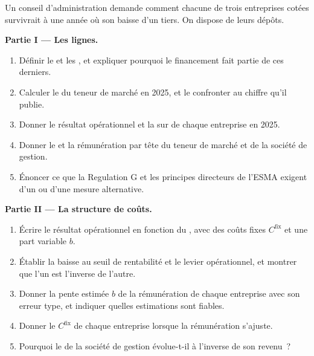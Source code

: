 \begin{problem}\label{pb:fm:the-economics-of-a-trading-firm:1}
Un conseil d'administration demande comment chacune de trois entreprises cotées survivrait à une année où son  baisse d'un tiers. On dispose de leurs dépôts.

\medskip\noindent\textbf{Partie I --- Les lignes.}
\begin{enumerate}
\item Définir le  et les , et expliquer pourquoi le financement fait partie de ces derniers.
\item Calculer le  du teneur de marché en 2025, et le confronter au chiffre qu'il publie.
\item Donner le résultat opérationnel et la  sur  de chaque entreprise en 2025.
\item Donner le  et la rémunération par tête du teneur de marché et de la société de gestion.
\item Énoncer ce que la Regulation G et les principes directeurs de l'ESMA exigent d'un  ou d'une mesure alternative.
\end{enumerate}

\medskip\noindent\textbf{Partie II --- La structure de coûts.}
\begin{enumerate}[resume]
\item Écrire le résultat opérationnel en fonction du , avec des coûts fixes $C^{\mathrm{fix}}$ et une part variable $b$.
\item Établir la baisse au seuil de rentabilité et le levier opérationnel, et montrer que l'un est l'inverse de l'autre.
\item Donner la pente estimée $b$ de la rémunération de chaque entreprise avec son erreur type, et indiquer quelles estimations sont fiables.
\item Donner le $C^{\mathrm{fix}}$ de chaque entreprise lorsque la rémunération s'ajuste.
\item Pourquoi le  de la société de gestion évolue-t-il à l'inverse de son revenu~?
\end{enumerate}


\end{problem}
